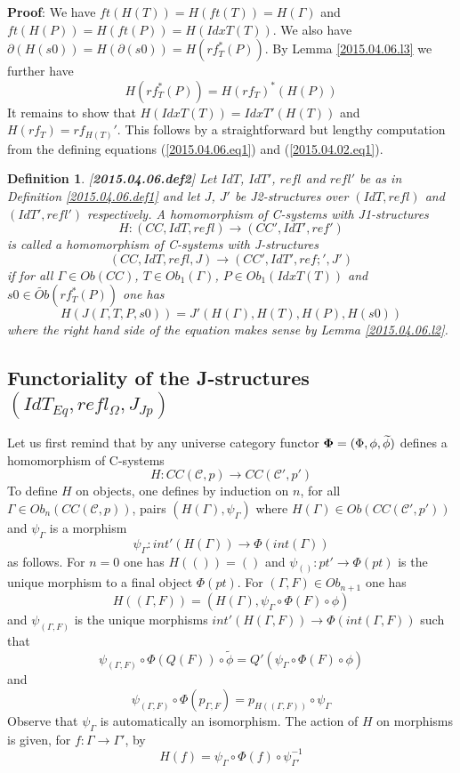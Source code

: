 \documentclass[12pt]{article}
\newenvironment{myproof}{{\bf Proof}:}{\vskip 5mm }
\newtheorem{definition}[proposition]{Definition}
\newcommand{\llabel}[1]{\label{#1}[{\bf #1}]}
\newcommand{\sr}{\rightarrow}
\newcommand{\wt}{\widetilde}
\begin{document}
%
\begin{myproof}
We have $ft(H(T))=H(ft(T))=H(\Gamma)$ and $ft(H(P))=H(ft(P))=H(IdxT(T))$. We also have $\partial(H(s0))=H(\partial(s0))=H(rf_T^*(P))$. By Lemma \ref{2015.04.06.l3} we further have
%
$$H(rf_T^*(P))=H(rf_T)^*(H(P))$$
%
It remains to show that $H(IdxT(T))=IdxT'(H(T))$ and $H(rf_T)=rf_{H(T)}'$. This follows by a straightforward but lengthy computation from the defining equations (\ref{2015.04.06.eq1}) and (\ref{2015.04.02.eq1}).
\end{myproof}
%
\begin{definition}
\llabel{2015.04.06.def2}
Let $IdT$, $IdT'$, $refl$ and $refl'$ be as in Definition \ref{2015.04.06.def1} and let $J$, $J'$ be J2-structures over $(IdT,refl)$ and $(IdT',refl')$ respectively. A homomorphism of C-systems with J1-structures 
%
$$H:(CC,IdT,refl)\sr (CC',IdT',ref')$$
%
is called a homomorphism of C-systems with J-structures 
%
$$(CC,IdT,refl,J)\sr (CC',IdT',ref;',J')$$
%
if for all $\Gamma\in Ob(CC)$, $T\in Ob_1(\Gamma)$, $P\in Ob_1(IdxT(T))$ and $s0\in \wt{Ob}(rf_T^*(P))$ one has
%
$$H(J(\Gamma,T,P,s0))=J'(H(\Gamma),H(T),H(P),H(s0))$$
%
where the right hand side of the equation makes sense by Lemma \ref{2015.04.06.l2}.
\end{definition}
%











\subsection{Functoriality of the J-structures $(IdT_{Eq},refl_{\Omega},J_{Jp})$}
%
\label{2015.04.12.sec1}
%
Let us first remind that by \cite[Construction 4.7]{Cfromauniverse} any universe category functor ${\bf \Phi}=(\Phi,\phi,\wt{\phi})$ defines a homomorphism of C-systems
%
$$H:CC({\mathcal C},p)\sr CC({\mathcal C}',p')$$
%
To define $H$ on objects, one defines by induction on $n$, for all $\Gamma\in Ob_n(CC({\mathcal C},p))$,  pairs $(H(\Gamma),\psi_{\Gamma})$ where $H(\Gamma)\in Ob(CC({\mathcal C}',p'))$ and $\psi_{\Gamma}$ is a morphism 
%
$$\psi_{\Gamma}:int'(H(\Gamma))\sr \Phi(int(\Gamma))$$
%
as follows. For $n=0$ one has $H(())=()$ and $\psi_{()}:pt'\sr \Phi(pt)$ is the unique morphism to a final object $\Phi(pt)$. For $(\Gamma,F)\in Ob_{n+1}$ one has 
%
$$H((\Gamma,F))=(H(\Gamma),\psi_{\Gamma}\circ\Phi(F)\circ \phi)$$
%
and $\psi_{(\Gamma,F)}$ is the unique morphisms $int'(H(\Gamma,F))\sr \Phi(int(\Gamma,F))$ such that
%
$$\psi_{(\Gamma,F)}\circ \Phi(Q(F))\circ\wt{\phi}=Q'(\psi_{\Gamma}\circ\Phi(F)\circ\phi)$$
%
and
%
$$\psi_{(\Gamma,F)}\circ \Phi(p_{\Gamma,F})=p_{H((\Gamma,F))}\circ \psi_{\Gamma}$$
%
Observe that $\psi_{\Gamma}$ is automatically an isomorphism. The action of $H$ on morphisms is given, for $f:\Gamma\sr\Gamma'$, by
%
$$H(f)=\psi_{\Gamma}\circ\Phi(f)\circ\psi_{\Gamma'}^{-1}$$
%
\end{document}
